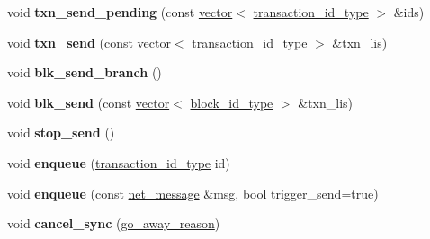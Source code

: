 \begin{DoxyCompactItemize}
\item 
\mbox{\label{classaacio_1_1connection_a28ba6e09ddf30e08901c83f02df5dd32}} 
void {\bfseries txn\+\_\+send\+\_\+pending} (const \mbox{\hyperlink{classstd_1_1vector}{vector}}$<$ \mbox{\hyperlink{classfc_1_1sha256}{transaction\+\_\+id\+\_\+type}} $>$ \&ids)
\item 
\mbox{\label{classaacio_1_1connection_ab106184805a13e51703e2be34c1258d8}} 
void {\bfseries txn\+\_\+send} (const \mbox{\hyperlink{classstd_1_1vector}{vector}}$<$ \mbox{\hyperlink{classfc_1_1sha256}{transaction\+\_\+id\+\_\+type}} $>$ \&txn\+\_\+lis)
\item 
\mbox{\label{classaacio_1_1connection_aa7b102e6d4d959ba5dd203080b48bdc0}} 
void {\bfseries blk\+\_\+send\+\_\+branch} ()
\item 
\mbox{\label{classaacio_1_1connection_a381782056276af376f974356500f17fb}} 
void {\bfseries blk\+\_\+send} (const \mbox{\hyperlink{classstd_1_1vector}{vector}}$<$ \mbox{\hyperlink{classfc_1_1sha256}{block\+\_\+id\+\_\+type}} $>$ \&txn\+\_\+lis)
\item 
\mbox{\label{classaacio_1_1connection_ad4e1db29065812c4821d1c5d77490cd5}} 
void {\bfseries stop\+\_\+send} ()
\item 
\mbox{\label{classaacio_1_1connection_ab5ebb8645fda8b5dd1ccd50c38907e31}} 
void {\bfseries enqueue} (\mbox{\hyperlink{classfc_1_1sha256}{transaction\+\_\+id\+\_\+type}} id)
\item 
\mbox{\label{classaacio_1_1connection_ab5d1c7bb01d3b60c1684945000e1fadb}} 
void {\bfseries enqueue} (const \mbox{\hyperlink{classfc_1_1static__variant}{net\+\_\+message}} \&msg, bool trigger\+\_\+send=true)
\item 
\mbox{\label{classaacio_1_1connection_ab2026d13c69f7fe7d828d989dfed8898}} 
void {\bfseries cancel\+\_\+sync} (\mbox{\hyperlink{plugins_2net__plugin_2include_2aacio_2net__plugin_2protocol_8hpp_a1b8490273cc36ec0241920722ba18ab4}{go\+\_\+away\+\_\+reason}})
\item 

\end{DoxyCompactItemize}
